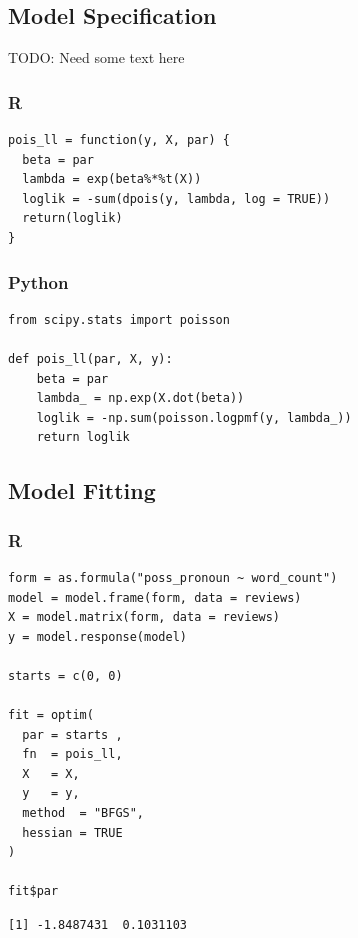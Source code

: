 \documentclass[
  letterpaper,
]{krantz}
\begin{document}
\subsection{Model Specification}\label{sec-glm-poisson-spec}

TODO: Need some text here

\subsubsection{R}

\begin{verbatim}
pois_ll = function(y, X, par) {
  beta = par
  lambda = exp(beta%*%t(X))
  loglik = -sum(dpois(y, lambda, log = TRUE))
  return(loglik)
}
\end{verbatim}

\subsubsection{Python}

\begin{verbatim}
from scipy.stats import poisson

def pois_ll(par, X, y):
    beta = par
    lambda_ = np.exp(X.dot(beta))
    loglik = -np.sum(poisson.logpmf(y, lambda_))
    return loglik
\end{verbatim}

\subsection{Model Fitting}\label{sec-glm-poisson-fitting}

\subsubsection{R}

\begin{verbatim}
form = as.formula("poss_pronoun ~ word_count")
model = model.frame(form, data = reviews)
X = model.matrix(form, data = reviews)
y = model.response(model)

starts = c(0, 0)

fit = optim(
  par = starts ,
  fn  = pois_ll,
  X   = X,
  y   = y,
  method  = "BFGS",
  hessian = TRUE
)

fit$par
\end{verbatim}

\begin{verbatim}
[1] -1.8487431  0.1031103
\end{verbatim}
\end{document}

